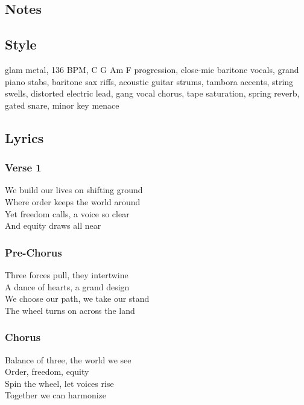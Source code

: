 \documentclass[]{article}
\begin{document}
\subsection{Notes}\label{notes-46}

\subsection{Style}\label{style-46}

glam metal, 136 BPM, C G Am F progression, close-mic baritone vocals,
grand piano stabs, baritone sax riffs, acoustic guitar strums, tambora
accents, string swells, distorted electric lead, gang vocal chorus, tape
saturation, spring reverb, gated snare, minor key menace

\subsection{Lyrics}\label{lyrics-46}

\subsubsection{Verse 1}\label{verse-1-29}

We build our lives on shifting ground\\
Where order keeps the world around\\
Yet freedom calls, a voice so clear\\
And equity draws all near

\subsubsection{Pre-Chorus}\label{pre-chorus-53}

Three forces pull, they intertwine\\
A dance of hearts, a grand design\\
We choose our path, we take our stand\\
The wheel turns on across the land

\subsubsection{Chorus}\label{chorus-81}

Balance of three, the world we see\\
Order, freedom, equity\\
Spin the wheel, let voices rise\\
Together we can harmonize
\end{document}
